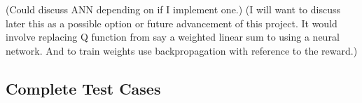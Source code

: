 \documentclass{report}
\begin{document}
(Could discuss ANN depending on if I implement one.)
(I will want to discuss later this as a possible option or future advancement of this project. It would involve replacing Q function from say a weighted
 linear sum to using a neural network. And to train weights use backpropagation with reference to the reward.)

\begin{appendices}
\chapter{Complete Test Cases}
\end{appendices}

\printglossaries



\end{document}
